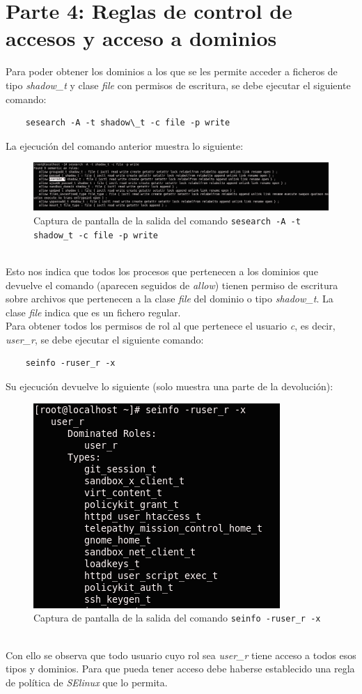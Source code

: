 \documentclass[10pt,a4paper]{article}
\begin{document}
\newpage
\section{Parte 4: Reglas de control de accesos y acceso a dominios}
Para poder obtener los dominios a los que se les permite acceder a ficheros de tipo \textit{shadow\_t} y clase \textit{file} con permisos de escritura, se debe ejecutar el siguiente comando: 
\begin{lstlisting}
	sesearch -A -t shadow\_t -c file -p write
\end{lstlisting}
La ejecución del comando anterior muestra lo siguiente: 
\begin{figure}[h!]
	\centering
	\includegraphics[scale=0.7]{images/parte4_15.png}
	\caption{Captura de pantalla de la salida del comando \texttt{sesearch -A -t shadow\_t -c file -p write}}
	\label{fig:parte4_15}
\end{figure}\\

Esto nos indica que todos los procesos que pertenecen a los dominios que devuelve el comando (aparecen seguidos de \textit{allow}) tienen permiso de escritura sobre archivos que pertenecen a la clase \textit{file} del dominio o tipo \textit{shadow\_t}. La clase \textit{file} indica que es un fichero regular. \\

Para obtener todos los permisos de rol al que pertenece el usuario \textit{c}, es decir, \textit{user\_r}, se debe ejecutar el siguiente comando: 
\begin{lstlisting}
	seinfo -ruser_r -x
\end{lstlisting}  

Su ejecución devuelve lo siguiente (solo muestra una parte de la devolución): 
\begin{figure}[h!]
	\centering
	\includegraphics[scale=0.7]{images/parte4_16.png}
	\caption{Captura de pantalla de la salida del comando \texttt{seinfo -ruser\_r -x}}
	\label{fig:parte4_16}
\end{figure}\\

Con ello se observa que todo usuario cuyo rol sea \textit{user\_r} tiene acceso a todos esos tipos y dominios. Para que pueda tener acceso debe haberse establecido una regla de política de \textit{SElinux} que lo permita. 
\end{document}
